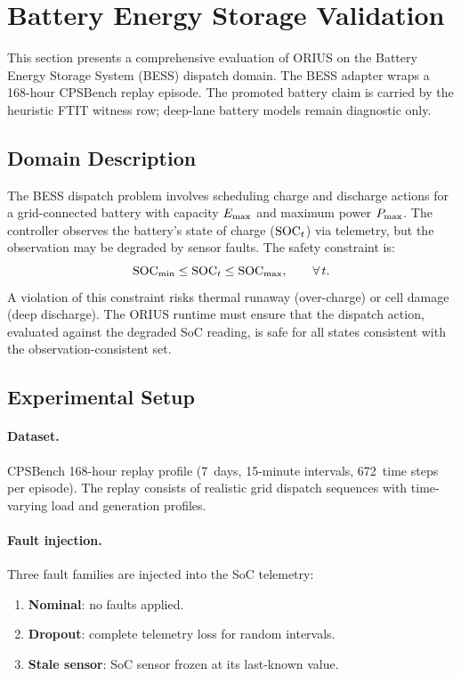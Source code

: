 \section{Battery Energy Storage Validation}\label{sec:battery}

This section presents a comprehensive evaluation of ORIUS on the Battery Energy
Storage System (BESS) dispatch domain.  The BESS adapter wraps a 168-hour
CPSBench replay episode.  The promoted battery claim is carried by the heuristic
FTIT witness row; deep-lane battery models remain diagnostic only.

\subsection{Domain Description}

The BESS dispatch problem involves scheduling charge and discharge actions for a
grid-connected battery with capacity $E_{\max}$ and maximum power $P_{\max}$.  The
controller observes the battery's state of charge ($\mathrm{SOC}_t$) via telemetry, but the
observation may be degraded by sensor faults.  The safety constraint is:
\begin{equation}\label{eq:soc_constraint}
  \mathrm{SOC}_{\min} \le \mathrm{SOC}_t \le \mathrm{SOC}_{\max}, \qquad \forall\, t.
\end{equation}
A violation of this constraint risks thermal runaway (over-charge) or cell damage
(deep discharge).  The ORIUS runtime must ensure that the dispatch action, evaluated
against the degraded SoC reading, is safe for all states consistent with the
observation-consistent set.

\subsection{Experimental Setup}

\paragraph{Dataset.}  CPSBench 168-hour replay profile (7~days, 15-minute intervals,
672~time steps per episode).  The replay consists of realistic grid dispatch sequences
with time-varying load and generation profiles.

\paragraph{Fault injection.}  Three fault families are injected into the SoC
telemetry:
\begin{enumerate}[nosep]
  \item \textbf{Nominal}: no faults applied.
  \item \textbf{Dropout}: complete telemetry loss for random intervals.
  \item \textbf{Stale sensor}: SoC sensor frozen at its last-known value.
\end{enumerate}

